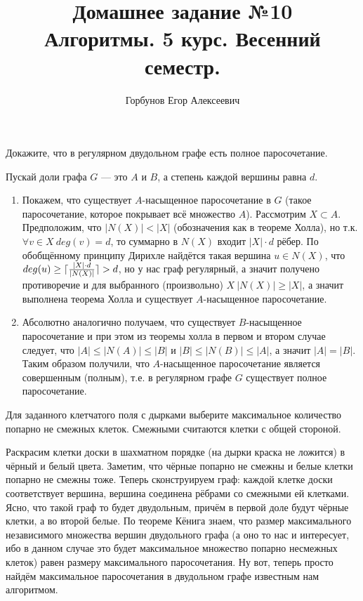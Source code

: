 

\title{Домашнее задание №10 \\ Алгоритмы. 5 курс. Весенний семестр.}
\author{Горбунов Егор Алексеевич}


\maketitle
\begin{task}[1]
Докажите, что в регулярном двудольном графе есть полное паросочетание.
\end{task}
\begin{solution}
Пускай доли графа $G$ --- это $A$ и $B$, а степень каждой вершины равна $d$.
\begin{enumerate}[label=\arabic*.]
\item Покажем, что существует $A$-насыщенное паросочетание в $G$ (такое паросочетание, которое покрывает всё множество $A$). Рассмотрим $X \subset A$. Предположим, что $|N(X)| < |X|$ (обозначения как в теореме Холла), но т.к. $\forall v \in X\ deg(v) = d$, то суммарно в $N(X)$ входит $|X|\cdot d$ рёбер. По обобщённому принципу Дирихле найдётся такая вершина $u \in N(X)$, что $deg(u) \geq \lceil\frac{|X|\cdot d}{|N(X)|}\rceil > d$, но у нас граф регулярный, а значит получено противоречие и для выбранного (произвольно) $X\ |N(X)| \geq |X|$, а значит выполнена теорема Холла и существует $A$-насыщенное паросочетание.
\item Абсолютно аналогично получаем, что существует $B$-насыщенное паросочетание и при этом из теоремы холла в первом и втором случае следует, что $|A| \leq |N(A)| \leq |B|$ и $|B| \leq |N(B)| \leq |A|$, а значит $|A| = |B|$. Таким образом получили, что $A$-насыщенное паросочетание является совершенным (полным), т.е. в регулярном графе $G$ существует полное паросочетание. \xqed
\end{enumerate}
\end{solution}

\begin{task}[2]
Для заданного клетчатого поля с дырками выберите максимальное количество попарно не смежных клеток. 
Смежными считаются клетки с общей стороной.
\end{task}
\begin{solution}
Раскрасим клетки доски в шахматном порядке (на дырки краска не ложится) в чёрный и белый цвета. Заметим, что чёрные попарно не смежны и белые клетки попарно не смежны тоже. Теперь сконструируем граф: каждой клетке доски соответствует вершина, вершина соединена рёбрами со смежными ей клетками. Ясно, что такой граф то будет двудольным, причём в первой доле будут чёрные клетки, а во второй белые. По теореме Кёнига знаем, что размер максимального независимого множества вершин двудольного графа (а оно то нас и интересует, ибо в данном случае это будет максимальное множество попарно несмежных клеток) равен размеру максимального паросочетания. Ну вот, теперь просто найдём максимальное паросочетания в двудольном графе известным нам алгоритмом. \xqed 
\end{solution}

